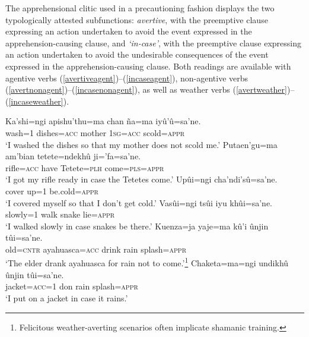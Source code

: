 \documentclass[output=paper,colorlinks,citecolor=brown]{langscibook}
\begin{document}
The apprehensional clitic  used in a precautioning fashion displays the two typologically attested subfunctions: \textit{avertive}, with the preemptive clause expressing an action undertaken to avoid the event expressed in the apprehension-causing clause, and \textit{`in-case'}, with the preemptive clause expressing an action undertaken to avoid the {undesirable} consequences of the event expressed in the ap\-pre\-hen\-sion-causing clause. Both readings are available with agentive verbs (\ref{avertiveagent})--(\ref{incaseagent}), non-agentive verbs (\ref{avertnonagent})--(\ref{incasenonagent}), as well as weather verbs (\ref{avertweather})--(\ref{incaseweather}).
\begin{exe}
    \ex \label{avertiveagent}
    \gll Ka’shi=ngi apishu’thu=ma       {\ob}chan    ña=ma       iyû’û=sa’ne.{\cb} \\
             wash=\textsc{1} dishes=\textsc{acc}  mother  \textsc{1sg=acc} scold=\textsc{appr} \\
    \glt `I washed the dishes so that my mother does not scold me.'
    \ex \label{incaseagent}
    \gll Putaen'gu=ma am'bian {\ob}tetete=ndekhû ji='fa=sa'ne.{\cb} \\
         rifle=\textsc{acc} have    Tetete=\textsc{plh} come=\textsc{pls=appr} \\
    \glt `I got my rifle ready in case the Tetetes come.'
    \ex \label{avertnonagent}
    \gll Upûi=ngi {\ob}cha'ndi'sû=sa'ne.{\cb} \\
         {cover up}\textsc{=}1 {be.cold=\textsc{appr}} \\
    \glt `I covered myself so that I don't get cold.'
    \ex \label{incasenonagent}
    \gll Vasûi=ngi    tsûi  {\ob}iyu     khûi=sa'ne.{\cb} \\
         slowly=\textsc{1}   walk    snake   lie=\textsc{appr} \\
    \glt `I walked slowly in case snakes be there.'
    \ex \label{avertweather}
    \gll Kuenza=ja yaje=ma            kû'i {\ob}ûnjin tûi=sa'ne.{\cb} \\
         old=\textsc{cntr} ayahuasca=\textsc{acc} drink  rain    splash=\textsc{appr} \\
    \glt `The elder drank ayahuasca for rain not to come.'\footnote{Felicitous weather-averting scenarios often implicate shamanic training.}
    \ex \label{incaseweather}
    \gll Chaketa=ma=ngi     undikhû {\ob}ûnjin tûi=sa'ne.{\cb} \\
         jacket=\textsc{acc=1}   don       rain    splash=\textsc{appr} \\
    \glt `I put on a jacket in case it rains.'
\end{exe}
\end{document}

